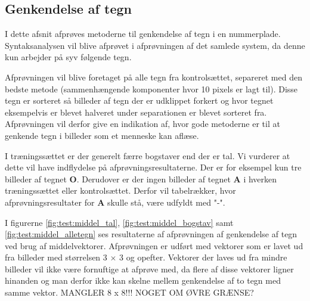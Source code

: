 \begin{comment}
Problemer ved 10: tegn der er smeltet sammen pga. søm skruer: OE26906 og ----290. Godt udskåret: UX33152, skæve plader et problem. go kontrast: YE39734.

Problemer ved 20: for stort område giver komponenter der ikke klippes bort, fordi kontrastforstærkning giver et andet resultat, her ville dynamisk kontrast-blok størrelse måske hjælpe. Dårlig indskrænk XK29750. TS57793: GOD(?) 

Problemer ve 30: stadig for stort område: giver komponenter udenfor der vælges. dårlig indskrænk, især foran? eksempler.

\end{comment}


\subsection{Genkendelse af tegn}
I dette afsnit afprøves metoderne til genkendelse af tegn i en nummerplade. Syntaksanalysen vil blive afprøvet i afprøvningen af det samlede system, da denne kun arbejder på syv følgende tegn.

Afprøvningen vil blive foretaget på alle tegn fra kontrolsættet, separeret med den bedste metode (sammenhængende komponenter hvor 10 pixels er lagt til). Disse tegn er sorteret så billeder af tegn der er udklippet forkert og hvor tegnet eksempelvis er blevet halveret under separationen er blevet sorteret fra. Afprøvningen vil derfor give en indikation af, hvor gode metoderne er til at genkende tegn i billeder som et menneske kan aflæse.

I træningssættet er der generelt færre bogstaver end der er tal. Vi vurderer at dette vil have indflydelse på afprøvningsresultaterne. Der er for eksempel kun tre billeder af tegnet \textbf{O}. Derudover er der ingen billeder af tegnet \textbf{A} i hverken træningssættet eller kontrolsættet. Derfor vil tabelrækker, hvor afprøvningsresultater for \textbf{A} skulle stå, være udfyldt med "-".


I figurerne \vref{fig:test:middel_tal}, \vref{fig:test:middel_bogstav} samt \vref{fig:test:middel_alletegn} ses resultaterne af afprøvningen af genkendelse af tegn ved brug af middelvektorer. Afprøvningen er udført med vektorer som er lavet ud fra billeder med størrelsen 3 $\times$ 3 og opefter. Vektorer der laves ud fra mindre billeder vil ikke være fornuftige at afprøve med, da flere af disse vektorer ligner hinanden og man derfor ikke kan skelne mellem genkendelse af to tegn med samme vektor. MANGLER 8 x 8!!! NOGET OM ØVRE GRÆNSE?

